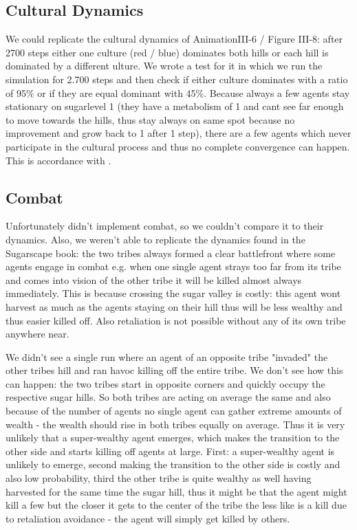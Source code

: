 \subsection{Cultural Dynamics}
We could replicate the cultural dynamics of AnimationIII-6 / Figure III-8: after 2700 steps either one culture (red / blue) dominates both hills or each hill is dominated by a different ulture. We wrote a test for it in which we run the simulation for 2.700 steps and then check if either culture dominates with a ratio of 95\% or if they are equal dominant with 45\%. Because always a few agents stay stationary on sugarlevel 1 (they have a metabolism of 1 and cant see far enough to move towards the hills, thus stay always on same spot because no improvement and grow back to 1 after 1 step), there are a few agents which never participate in the cultural process and thus no complete convergence can happen. This is accordance with \cite{weaver_replicating_2009}.

\subsection{Combat}
Unfortunately \cite{weaver_replicating_2009} didn't implement combat, so we couldn't compare it to their dynamics. Also, we weren't able to replicate the dynamics found in the Sugarscape book: the two tribes always formed a clear battlefront where some agents engage in combat e.g. when one single agent strays too far from its tribe and comes into vision of the other tribe it will be killed almost always immediately. This is because crossing the sugar valley is costly: this agent wont harvest as much as the agents staying on their hill thus will be less wealthy and thus easier killed off. Also retaliation is not possible without any of its own tribe anywhere near.

We didn't see a single run where an agent of an opposite tribe "invaded" the other tribes hill and ran havoc killing off the entire tribe. We don't see how this can happen: the two tribes start in opposite corners and quickly occupy the respective sugar hills. So both tribes are acting on average the same and also because of the number of agents no single agent can gather extreme amounts of wealth - the wealth should rise in both tribes equally on average. Thus it is very unlikely that a super-wealthy agent emerges, which makes the transition to the other side and starts killing off agents at large. First: a super-wealthy agent is unlikely to emerge, second making the transition to the other side is costly and also low probability, third the other tribe is quite wealthy as well having harvested for the same time the sugar hill, thus it might be that the agent might kill a few but the closer it gets to the center of the tribe the less like is a kill due to retaliation avoidance - the agent will simply get killed by others.

